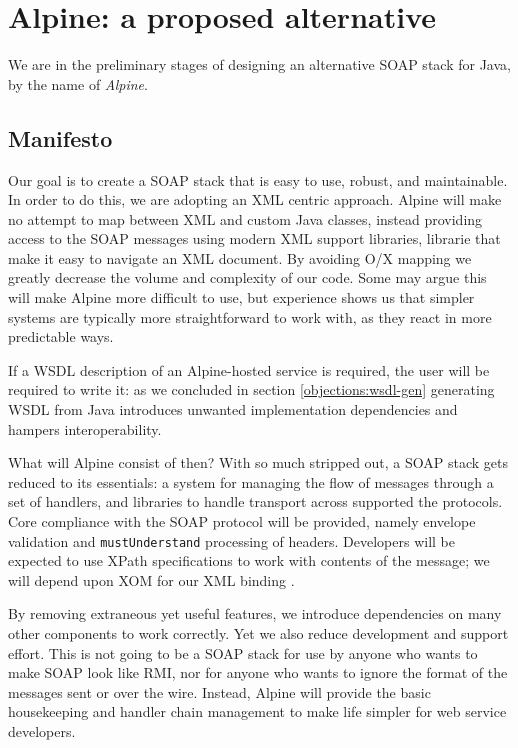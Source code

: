 \section{Alpine: a proposed alternative}
\label{alpine}

We are in the preliminary stages of designing an alternative SOAP
stack for Java, by the name of \emph{Alpine}.

\subsection{Manifesto}
\label{alpine:manifesto}

Our goal is to create a SOAP stack that is easy to use, robust, and
maintainable. In order to do this, we are adopting an XML centric
approach. Alpine will make no attempt to map between XML and custom Java
classes, instead providing access to the SOAP messages using modern XML
support libraries, librarie that make it easy to navigate an XML
document. By avoiding O/X mapping we greatly decrease the volume and
complexity of our code. Some may argue this will make Alpine more
difficult to use, but experience shows us that simpler systems are
typically more straightforward to work with, as they react in more
predictable ways.

If a WSDL description of an Alpine-hosted service is required, the
user will be required to write it: as we concluded in section
\ref{objections:wsdl-gen} generating WSDL from Java introduces
unwanted implementation dependencies and hampers interoperability.

What will Alpine consist of then? With so much stripped out, a SOAP
stack gets reduced to its essentials: a system for managing the flow
of messages through a set of handlers, and libraries to handle
transport across supported the protocols. Core compliance with the
SOAP protocol will be provided, namely envelope validation and
\verb|mustUnderstand| processing of headers. Developers will be
expected to use XPath specifications to work with contents of the
message; we will depend upon XOM for our XML binding
\cite{harold:xom}.

By removing extraneous yet useful features, we introduce dependencies
on many other components to work correctly. Yet we also reduce
development and support effort. This is not going to be a SOAP stack
for use by anyone who wants to make SOAP look like RMI, nor for anyone
who wants to ignore the format of the messages sent or over the wire.
Instead, Alpine will provide the basic housekeeping and handler
chain management to make life simpler for web service developers.

